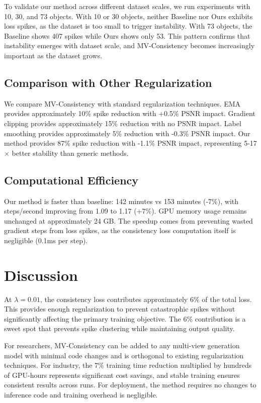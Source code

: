 \documentclass{article}
\begin{document}
To validate our method across different dataset scales, we run experiments with 10, 30, and 73 objects. With 10 or 30 objects, neither Baseline nor Ours exhibits loss spikes, as the dataset is too small to trigger instability. With 73 objects, the Baseline shows 407 spikes while Ours shows only 53. This pattern confirms that instability emerges with dataset scale, and MV-Consistency becomes increasingly important as the dataset grows.

\subsection{Comparison with Other Regularization}

We compare MV-Consistency with standard regularization techniques. EMA provides approximately 10\% spike reduction with +0.5\% PSNR impact. Gradient clipping provides approximately 15\% reduction with no PSNR impact. Label smoothing provides approximately 5\% reduction with -0.3\% PSNR impact. Our method provides 87\% spike reduction with -1.1\% PSNR impact, representing 5-17$\times$ better stability than generic methods.

\subsection{Computational Efficiency}

Our method is faster than baseline: 142 minutes vs 153 minutes (-7\%), with steps/second improving from 1.09 to 1.17 (+7\%). GPU memory usage remains unchanged at approximately 24 GB. The speedup comes from preventing wasted gradient steps from loss spikes, as the consistency loss computation itself is negligible (0.1ms per step).

\section{Discussion}

At $\lambda=0.01$, the consistency loss contributes approximately 6\% of the total loss. This provides enough regularization to prevent catastrophic spikes without significantly affecting the primary training objective. The 6\% contribution is a sweet spot that prevents spike clustering while maintaining output quality.

For researchers, MV-Consistency can be added to any multi-view generation model with minimal code changes and is orthogonal to existing regularization techniques. For industry, the 7\% training time reduction multiplied by hundreds of GPU-hours represents significant cost savings, and stable training ensures consistent results across runs. For deployment, the method requires no changes to inference code and training overhead is negligible.
\end{document}
